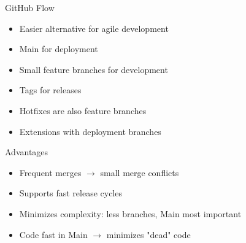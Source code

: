 \begin{frame}{\insertsubsection{} }
	\begin{fancycolumns}[animation=none]
		\begin{definition}{GitHub Flow}
			\begin{itemize}
				\item Easier alternative for agile development
				\item Main for deployment
				\item Small feature branches for development
				\item Tags for releases
				\item Hotfixes are also feature branches
				\item Extensions with deployment branches
			\end{itemize}
		\end{definition}\pause
		\begin{note}{Advantages}
			\begin{itemize}
				\item Frequent merges $\rightarrow$ small merge conflicts
				\item Supports fast release cycles
				\item Minimizes complexity: less branches, Main most important
				\item Code fast in Main $\rightarrow$ minimizes "dead" code
			\end{itemize}
		\end{note}
		\nextcolumn
	\end{fancycolumns}
\end{frame}


